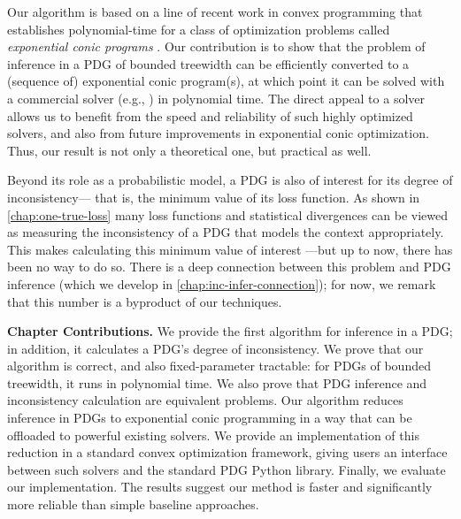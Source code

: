 Our algorithm
is based on a line of recent work in 
convex programming
that establishes
polynomial-time
for a class of optimization problems called \emph{exponential conic programs}
\parencite{badenbroek2021algorithm,skajaa2015homogeneous,nesterov1996infeasible}.
Our contribution is to show that the problem of inference in a PDG
of bounded treewidth
can be efficiently converted to a (sequence of) exponential conic program(s), at which point it can be solved with a commercial solver
(e.g., \textcite{mosek}) in polynomial time. 
The direct appeal to a solver allows us
to benefit from the speed and reliability of such highly optimized solvers, and also from future improvements in exponential conic optimization.
Thus, our result is not only a theoretical one, but practical as well.



Beyond its role as a probabilistic model,
a PDG is also of interest for its degree of inconsistency---%
that is, the minimum value of its loss function. 
As shown 
in \cref{chap:one-true-loss}
many loss functions and statistical divergences
can be viewed as measuring 
the inconsistency
of a PDG that models the context appropriately.
This makes calculating this minimum value of interest%
---but up to now, 
there has been no way to do so.
%
There is a deep connection between this problem and PDG inference
    (which we develop in \cref{chap:inc-infer-connection});
for now, we remark that this number is a byproduct of our techniques.
    
 



\textbf{Chapter Contributions.}
We provide the first algorithm for inference in a PDG;
in addition, it calculates a PDG's degree of inconsistency. 
We prove that 
our algorithm
is correct, and also
fixed-parameter tractable: for PDGs of bounded treewidth,
it runs in polynomial time.
We also prove that PDG inference and inconsistency 
    calculation are equivalent problems.
Our algorithm reduces inference in PDGs to exponential conic programming
in a way that can be offloaded to powerful existing solvers.
We provide an implementation of this reduction in a
standard convex optimization framework, giving users an
interface between such solvers and the standard PDG Python library.
Finally, we evaluate our implementation. The
    results suggest our method is faster and 
    significantly more reliable than simple baseline approaches.

